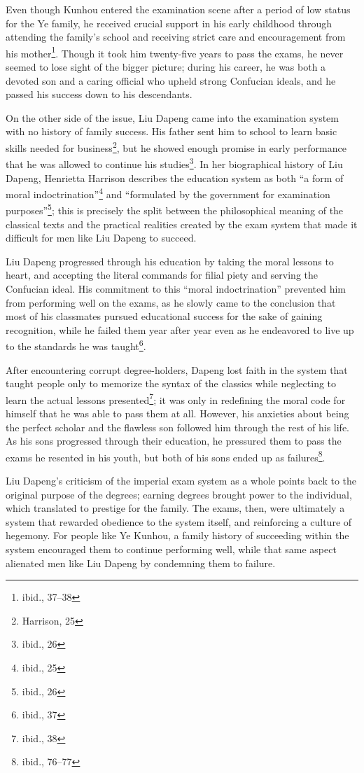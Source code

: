 Even though Kunhou entered the examination scene after a period of low status
for the Ye family, he received crucial support in his early childhood through
attending the family's school and receiving strict care and encouragement from
his mother\footnote{ibid., 37--38}. Though it took him twenty-five years to pass
the exams, he never seemed to lose sight of the bigger picture; during his
career, he was both a devoted son and a caring official who upheld strong
Confucian ideals, and he passed his success down to his descendants.

On the other side of the issue, Liu Dapeng came into the examination system with
no history of family success. His father sent him to school to learn basic
skills needed for business\footnote{Harrison, 25}, but he showed enough promise
in early performance that he was allowed to continue his studies\footnote{ibid.,
26}. In her biographical history of Liu Dapeng, Henrietta Harrison describes the
education system as both ``a form of moral indoctrination''\footnote{ibid., 25}
and ``formulated by the government for examination purposes''\footnote{ibid.,
26}; this is precisely the split between the philosophical meaning of the
classical texts and the practical realities created by the exam system that made
it difficult for men like Liu Dapeng to succeed.

Liu Dapeng progressed through his education by taking the moral lessons to
heart, and accepting the literal commands for filial piety and serving the
Confucian ideal. His commitment to this ``moral indoctrination'' prevented him
from performing well on the exams, as he slowly came to the conclusion that most
of his classmates pursued educational success for the sake of gaining
recognition, while he failed them year after year even as he endeavored to live
up to the standards he was taught\footnote{ibid., 37}.

After encountering corrupt degree-holders, Dapeng lost faith in the system that
taught people only to memorize the syntax of the classics while neglecting to
learn the actual lessons presented\footnote{ibid., 38}; it was only in
redefining the moral code for himself that he was able to pass them at all.
However, his anxieties about being the perfect scholar and the flawless son
followed him through the rest of his life. As his sons progressed through their
education, he pressured them to pass the exams he resented in his youth, but
both of his sons ended up as failures\footnote{ibid., 76--77}.

Liu Dapeng's criticism of the imperial exam system as a whole points back to the
original purpose of the degrees; earning degrees brought power to the
individual, which translated to prestige for the family. The exams, then, were
ultimately a system that rewarded obedience to the system itself, and
reinforcing a culture of hegemony. For people like Ye Kunhou, a family history
of succeeding within the system encouraged them to continue performing well,
while that same aspect alienated men like Liu Dapeng by condemning them to
failure.
